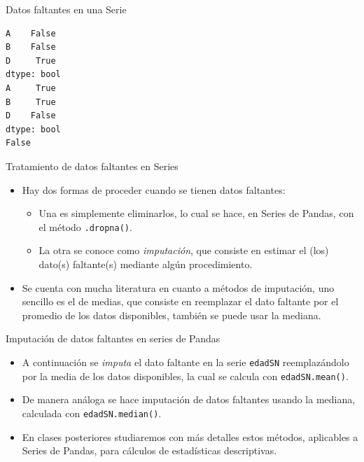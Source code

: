 \documentclass[
  ignorenonframetext,
  aspectratio=169,
  spanish,
]{beamer}
\providecommand{\tightlist}{%
  \setlength{\itemsep}{0pt}\setlength{\parskip}{0pt}}
\begin{document}
\begin{frame}[fragile]{Datos faltantes en una Serie}
\begin{block}{}
\begin{verbatim}
A    False
B    False
D     True
dtype: bool
A     True
B     True
D    False
dtype: bool
False
\end{verbatim}
\end{block}

\begin{block}{Tratamiento de datos faltantes en Series}
\label{tratamiento-de-datos-faltantes-en-series}
\begin{itemize}
\item
  Hay dos formas de proceder cuando se tienen datos faltantes:

  \begin{itemize}
  \tightlist
  \item
    Una es simplemente eliminarlos, lo cual se hace, en Series de
    Pandas, con el método \texttt{.dropna()}.
  \item
    La otra se conoce como 
     \emph{imputación}, que consiste
    en estimar el (los) dato(s) faltante(s) mediante algún
    procedimiento.
  \end{itemize}
\item
  Se cuenta con mucha literatura en cuanto a métodos de imputación, uno
  sencillo es el de medias, que consiste en reemplazar el dato faltante
  por el promedio de los datos disponibles, también se puede usar la
  mediana.
\end{itemize}
\end{block}

\begin{block}{Imputación de datos faltantes en series de Pandas}
\label{imputaciuxf3n-de-datos-faltantes-en-series-de-pandas}
\begin{itemize}
\item
  A continuación se \emph{imputa} el dato faltante en la serie
  \texttt{edadSN} reemplazándolo por la media de los datos disponibles,
  la cual se calcula con \texttt{edadSN.mean()}.
\item
  De manera análoga  se hace
  imputación de datos faltantes usando la mediana, calculada con
  \texttt{edadSN.median()}.
\item
  En clases posteriores studiaremos con más detalles estos métodos,
  aplicables a Series de Pandas, para cálculos de estadísticas
  descriptivas.
\end{itemize}
\end{block}


\end{frame}
\end{document}
